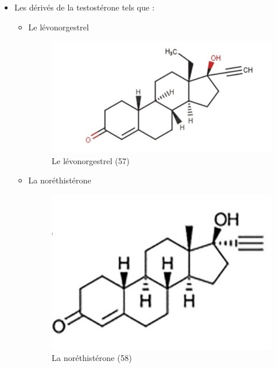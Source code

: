 \begin{itemize}[label={$\bullet$}, align=right] 
  \item Les dérivés de la testostérone tels que : 
  \begin{itemize}[label={$\circ$}]
    \item Le lévonorgestrel
    \begin{figure}[H]
      \centering
      \includegraphics{Images/fig_26.jpg}
      \caption{Le lévonorgestrel (57)}
    \end{figure}
    \item La noréthistérone 
    \begin{figure}[H]
      \centering
      \includegraphics{Images/fig_27.jpg}
      \caption{La noréthistérone (58)}
    \end{figure}


\end{itemize}
\end{itemize}
